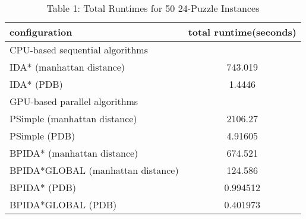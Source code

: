\documentclass[a4paper,11pt,oneside,openany]{jsbook}
\begin{document}
\begin{table}[]
\centering
\caption{Table 1: Total Runtimes for 50 24-Puzzle Instances}
\label{my-label}
\begin{tabular}{|l|c|}
\hline
configuration & \multicolumn{1}{l|}{total runtime(seconds)} \\ \hline
\multicolumn{2}{|l|}{CPU-based sequential algorithms} \\ \hline
IDA* (manhattan distance) & 743.019 \\
IDA* (PDB) & 1.4446 \\ \hline
\multicolumn{2}{|l|}{GPU-based parallel algorithms} \\ \hline
PSimple (manhattan distance) & 2106.27 \\
PSimple (PDB) & 4.91605 \\
BPIDA* (manhattan distance) & 674.521 \\
BPIDA*GLOBAL (manhattan distance) & 124.586 \\
BPIDA* (PDB) & 0.994512 \\
BPIDA*GLOBAL (PDB) & 0.401973 \\ \hline
\end{tabular}
\end{table}
\end{document}
